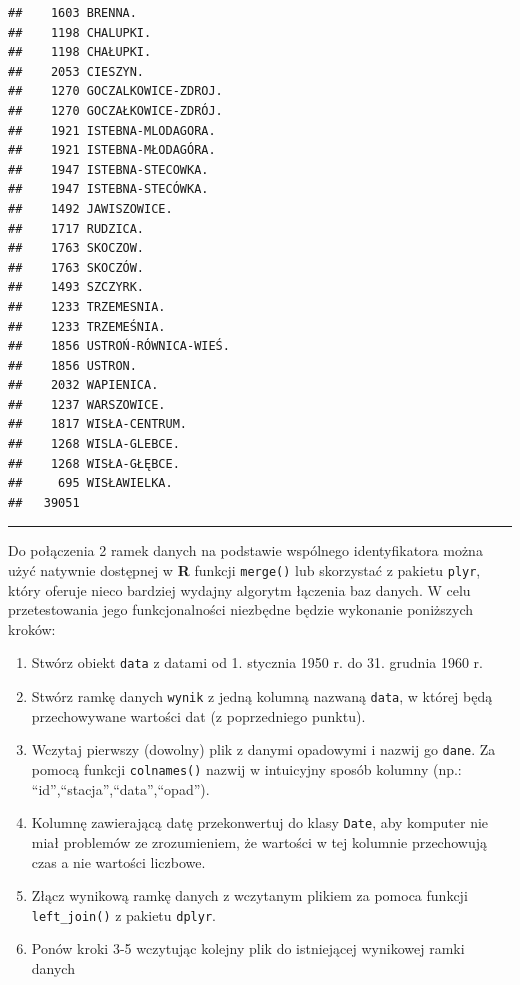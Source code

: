 \documentclass[]{book}
\providecommand{\tightlist}{%
  \setlength{\itemsep}{0pt}\setlength{\parskip}{0pt}}
\theoremstyle{definition}
\theoremstyle{definition}
\theoremstyle{definition}
\theoremstyle{remark}
\begin{document}
\begin{verbatim}
##    1603 BRENNA.
##    1198 CHALUPKI.
##    1198 CHAŁUPKI.
##    2053 CIESZYN.
##    1270 GOCZALKOWICE-ZDROJ.
##    1270 GOCZAŁKOWICE-ZDRÓJ.
##    1921 ISTEBNA-MLODAGORA.
##    1921 ISTEBNA-MŁODAGÓRA.
##    1947 ISTEBNA-STECOWKA.
##    1947 ISTEBNA-STECÓWKA.
##    1492 JAWISZOWICE.
##    1717 RUDZICA.
##    1763 SKOCZOW.
##    1763 SKOCZÓW.
##    1493 SZCZYRK.
##    1233 TRZEMESNIA.
##    1233 TRZEMEŚNIA.
##    1856 USTROŃ-RÓWNICA-WIEŚ.
##    1856 USTRON.
##    2032 WAPIENICA.
##    1237 WARSZOWICE.
##    1817 WISŁA-CENTRUM.
##    1268 WISLA-GLEBCE.
##    1268 WISŁA-GŁĘBCE.
##     695 WISŁAWIELKA.
##   39051
\end{verbatim}

\begin{center}\rule{0.5\linewidth}{\linethickness}\end{center}

Do połączenia 2 ramek danych na podstawie wspólnego identyfikatora można
użyć natywnie dostępnej w \textbf{R} funkcji \texttt{merge()} lub
skorzystać z pakietu \texttt{plyr}, który oferuje nieco bardziej wydajny
algorytm łączenia baz danych. W celu przetestowania jego funkcjonalności
niezbędne będzie wykonanie poniższych kroków:

\begin{enumerate}
\def\labelenumi{\arabic{enumi}.}
\tightlist
\item
  Stwórz obiekt \texttt{data} z datami od 1. stycznia 1950 r. do 31.
  grudnia 1960 r.
\item
  Stwórz ramkę danych \texttt{wynik} z jedną kolumną nazwaną
  \texttt{data}, w której będą przechowywane wartości dat (z
  poprzedniego punktu).
\item
  Wczytaj pierwszy (dowolny) plik z danymi opadowymi i nazwij go
  \texttt{dane}. Za pomocą funkcji \texttt{colnames()} nazwij w
  intuicyjny sposób kolumny (np.: ``id'',``stacja'',``data'',``opad'').
\item
  Kolumnę zawierającą datę przekonwertuj do klasy \texttt{Date}, aby
  komputer nie miał problemów ze zrozumieniem, że wartości w tej
  kolumnie przechowują czas a nie wartości liczbowe.
\item
  Złącz wynikową ramkę danych z wczytanym plikiem za pomoca funkcji
  \texttt{left\_join()} z pakietu \texttt{dplyr}.
\item
  Ponów kroki 3-5 wczytując kolejny plik do istniejącej wynikowej ramki
  danych
\end{enumerate}
\end{document}
